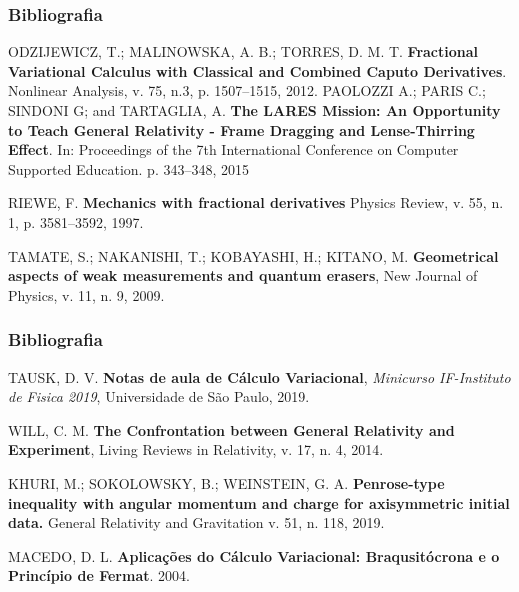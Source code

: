 \documentclass{beamer}
\theoremstyle{plain}
\theoremstyle{definition}
\theoremstyle{definition}
\theoremstyle{definition}
\theoremstyle{definition}
\theoremstyle{definition}
\theoremstyle{definition}
\theoremstyle{definition}
\theoremstyle{definition}
\begin{document}
\begin{frame}
\begin{thebibliography}{99} 
\frametitle{Bibliografia}
ODZIJEWICZ, T.; MALINOWSKA, A. B.; TORRES, D. M. T. {\bf Fractional Variational Calculus with Classical and Combined Caputo Derivatives}. Nonlinear Analysis, v. 75, n.3, p. 1507--1515, 2012.
PAOLOZZI A.; PARIS C.; SINDONI G; and TARTAGLIA, A. {\bf The LARES Mission: An Opportunity to Teach General Relativity - Frame Dragging and Lense-Thirring Effect}. In: Proceedings of the 7th International Conference on Computer Supported Education. p. 343--348, 2015

RIEWE, F. {\bf Mechanics with fractional derivatives} Physics Review, v. 55, n. 1, p. 3581--3592, 1997.


TAMATE, S.; NAKANISHI, T.; KOBAYASHI, H.; KITANO, M. {\bf Geometrical aspects of weak measurements and quantum erasers}, New Journal of Physics, v. 11, n. 9, 2009.

\end{thebibliography}
\end{frame}

\begin{frame}
\begin{thebibliography}{99}
\frametitle{Bibliografia}

TAUSK, D. V. {\bf Notas de aula de Cálculo Variacional}, {\it Minicurso IF-Instituto de Fisica 2019}, Universidade de São Paulo, 2019.

WILL, C. M. {\bf The Confrontation between General Relativity and Experiment}, Living Reviews in Relativity, v. 17, n. 4, 2014.

KHURI, M.; SOKOLOWSKY, B.; WEINSTEIN, G. A. {\bf Penrose-type inequality with angular momentum and charge for axisymmetric initial data.} General Relativity and Gravitation v. 51, n. 118, 2019.


MACEDO, D. L. {\bf Aplicações do Cálculo Variacional: Braqusitócrona e o Princípio
de Fermat}. 2004.
\end{thebibliography}
\end{frame}
\end{document}
